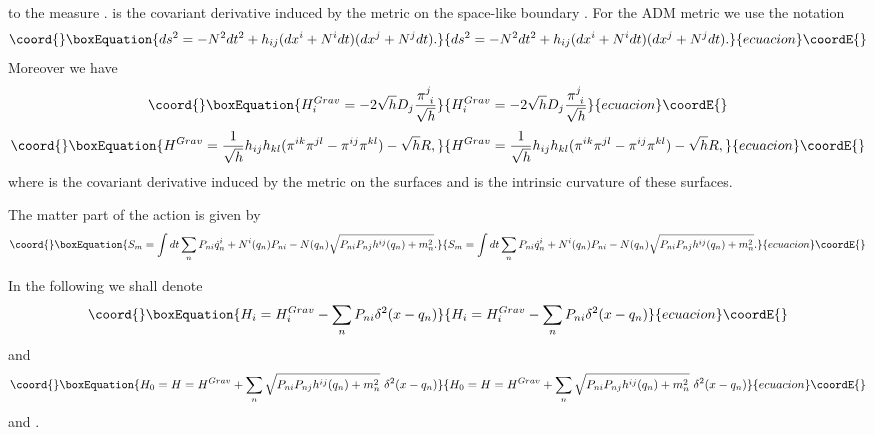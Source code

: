 \documentclass[a4paper,12pt]{article}
\begin{document}
to the measure \myHighlight{$\sqrt{\rho}$}\coordHE{}. \coordHE{} is the covariant 
derivative induced by the metric on the space-like boundary \coordHE{}.
For the ADM metric \cite{ADM} we use the notation
\begin{equation}\coord{}\boxEquation{
ds^2 = -N^2 dt^2 +h_{ij}(dx^i+N^i dt)(dx^j+N^j dt).
}{
ds^2 = -N^2 dt^2 +h_{ij}(dx^i+N^i dt)(dx^j+N^j dt).
}{ecuacion}\coordE{}\end{equation}
Moreover we have
\begin{equation}\coord{}\boxEquation{
H^{Grav}_i = -2 \sqrt h D_j\frac{\pi^j_{~i}}{\sqrt{h}}
}{
H^{Grav}_i = -2 \sqrt h D_j\frac{\pi^j_{~i}}{\sqrt{h}}
}{ecuacion}\coordE{}\end{equation}
\begin{equation}\coord{}\boxEquation{
H^{Grav} = \frac{1}{\sqrt{h}} h_{ij}h_{kl} (\pi^{ik}\pi^{jl}-\pi^{ij}\pi^{kl})
-\sqrt{h}R,
}{
H^{Grav} = \frac{1}{\sqrt{h}} h_{ij}h_{kl} (\pi^{ik}\pi^{jl}-\pi^{ij}\pi^{kl})
-\sqrt{h}R,
}{ecuacion}\coordE{}\end{equation}
where \coordHE{} is the covariant derivative induced by the
metric \coordHE{} on the surfaces \coordHE{} and \coordHE{} is the intrinsic
curvature of these surfaces.

The matter part of the action is given by
\begin{equation}\coord{}\boxEquation{\label{azionemateria}
S_m = \int
dt \sum_n P_{ni}\dot q^i_n+N^i(q_n)P_{ni}-N(q_n)
\sqrt{P_{ni} P_{nj} h^{ij}(q_n)+ m_n^2} .
}{S_m = \int
dt \sum_n P_{ni}\dot q^i_n+N^i(q_n)P_{ni}-N(q_n)
\sqrt{P_{ni} P_{nj} h^{ij}(q_n)+ m_n^2} .
}{ecuacion}\coordE{}\end{equation} 

In the following we shall denote
\begin{equation}\coord{}\boxEquation{
H_i=H_i^{Grav}-\sum_n P_{ni}\delta^2(x-q_n)
}{
H_i=H_i^{Grav}-\sum_n P_{ni}\delta^2(x-q_n)
}{ecuacion}\coordE{}\end{equation}
and
\begin{equation}\coord{}\boxEquation{
H_0=H=H^{Grav}+\sum_n \sqrt{P_{ni}P_{nj} h^{ij}(q_n)+m^2_n}~\delta^2(x-q_n)
}{
H_0=H=H^{Grav}+\sum_n \sqrt{P_{ni}P_{nj} h^{ij}(q_n)+m^2_n}~\delta^2(x-q_n)
}{ecuacion}\coordE{}\end{equation}
and \coordHE{}.
\end{document}
